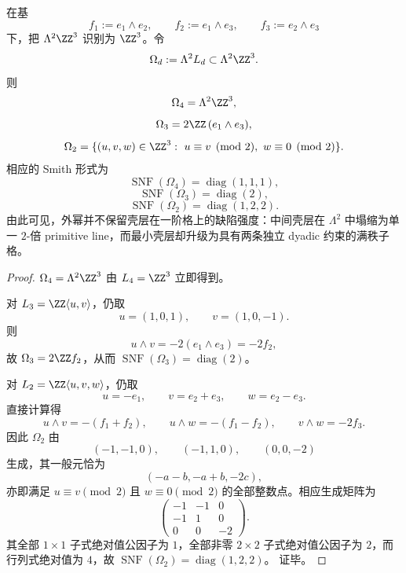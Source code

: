 \begin{theorem}\label{thm:conclusion-window6-exterior-shell-smith-geometry}
在基
\[
f_1:=e_1\wedge e_2,\qquad
f_2:=e_1\wedge e_3,\qquad
f_3:=e_2\wedge e_3
\]
下，把 \(\Lambda^2\ZZ^3\) 识别为 \(\ZZ^3\)。令
\[
\Omega_d:=\Lambda^2 L_d\subset \Lambda^2\ZZ^3.
\]
则
\[
\Omega_4=\Lambda^2\ZZ^3,
\]
\[
\Omega_3=2\ZZ\,(e_1\wedge e_3),
\]
\[
\Omega_2=\{(u,v,w)\in\ZZ^3:\ u\equiv v\pmod 2,\ w\equiv 0\pmod 2\}.
\]
相应的 Smith 形式为
\[
\operatorname{SNF}(\Omega_4)=\operatorname{diag}(1,1,1),
\]
\[
\operatorname{SNF}(\Omega_3)=\operatorname{diag}(2),
\]
\[
\operatorname{SNF}(\Omega_2)=\operatorname{diag}(1,2,2).
\]
由此可见，外幂并不保留壳层在一阶格上的缺陷强度：中间壳层在 \(\Lambda^2\) 中塌缩为单一 \(2\)-倍 primitive line，而最小壳层却升级为具有两条独立 dyadic 约束的满秩子格。
\end{theorem}
\begin{proof}
\(\Omega_4=\Lambda^2\ZZ^3\) 由 \(L_4=\ZZ^3\) 立即得到。

对 \(L_3=\ZZ\langle u,v\rangle\)，仍取
\[
u=(1,0,1),\qquad v=(1,0,-1).
\]
则
\[
u\wedge v=-2(e_1\wedge e_3)=-2f_2,
\]
故 \(\Omega_3=2\ZZ f_2\)，从而
\(
\operatorname{SNF}(\Omega_3)=\operatorname{diag}(2)
\)。

对 \(L_2=\ZZ\langle u,v,w\rangle\)，仍取
\[
u=-e_1,\qquad v=e_2+e_3,\qquad w=e_2-e_3.
\]
直接计算得
\[
u\wedge v=-(f_1+f_2),\qquad
u\wedge w=-(f_1-f_2),\qquad
v\wedge w=-2f_3.
\]
因此 \(\Omega_2\) 由
\[
(-1,-1,0),\qquad (-1,1,0),\qquad (0,0,-2)
\]
生成，其一般元恰为
\[
(-a-b,-a+b,-2c),
\]
亦即满足 \(u\equiv v\pmod 2\) 且 \(w\equiv 0\pmod 2\) 的全部整数点。相应生成矩阵为
\[
\begin{pmatrix}
-1&-1&0\\
-1&1&0\\
0&0&-2
\end{pmatrix}.
\]
其全部 \(1\times 1\) 子式绝对值公因子为 \(1\)，全部非零 \(2\times 2\) 子式绝对值公因子为 \(2\)，而行列式绝对值为 \(4\)，故
\(
\operatorname{SNF}(\Omega_2)=\operatorname{diag}(1,2,2)
\)。
证毕。
\end{proof}

